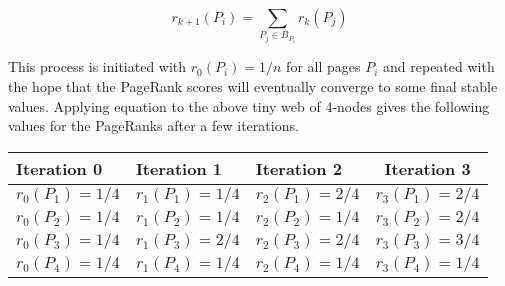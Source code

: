 $$
r_{k+1}\left(P_{i}\right)=\sum_{P_{j} \in B_{P_{i}}} r_{k}\left(P_{j}\right)
$$
\begin{center}
	\end{center}
	
\noindent This process is initiated with $r_{0}\left(P_{i}\right)=1 / n$ for all pages $P_{i}$ and repeated with the hope that the PageRank scores will eventually converge to some final stable values. Applying equation to the above tiny web of 4-nodes gives the following values for the PageRanks after a few iterations.
\\

\begin{table}[h]
	\centering
	\begin{tabular}{l l l c}
		\toprule
		\textbf{Iteration 0} & \textbf{Iteration 1} & \textbf{Iteration 2} & \textbf{Iteration 3}\\
		\midrule
		$r_{0}\left(P_{1}\right)=1 / 4$ & $r_{1}\left(P_{1}\right)=1 / 4$ & $r_{2}\left(P_{1}\right)=2 / 4$ & 
		$r_{3}\left(P_{1}\right)=2 / 4$\\
		$r_{0}\left(P_{2}\right)=1 / 4$ & $r_{1}\left(P_{2}\right)=1 / 4$ & $r_{2}\left(P_{2}\right)=1 / 4$ & 
		$r_{3}\left(P_{2}\right)=2 / 4$\\
		$r_{0}\left(P_{3}\right)=1 / 4$ & $r_{1}\left(P_{3}\right)=2 / 4$ & $r_{2}\left(P_{3}\right)=2 / 4$ & 
		$r_{3}\left(P_{3}\right)=3 / 4$\\
		$r_{0}\left(P_{4}\right)=1 / 4$ & $r_{1}\left(P_{4}\right)=1 / 4$ & $r_{2}\left(P_{4}\right)=1 / 4$& 
		$r_{3}\left(P_{4}\right)=1 / 4$\\
		\bottomrule
	\end{tabular}
\end{table}

